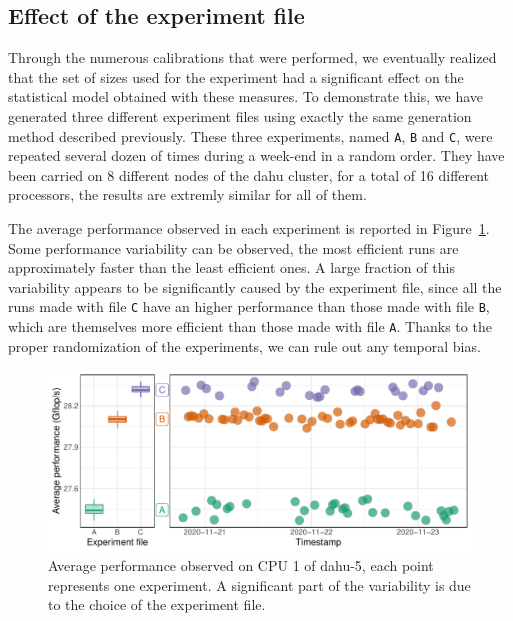         \subsection{Effect of the experiment file}%
        \label{sub:effect_experiment_file}

            Through the numerous \dgemm calibrations that were performed, we eventually realized that the set of sizes
            used for the experiment had a significant effect on the statistical model obtained with these measures. To
            demonstrate this, we have generated three different experiment files using exactly the same generation
            method described previously. These three experiments, named \texttt{A}, \texttt{B} and \texttt{C}, were
            repeated several dozen of times during a week-end in a random order. They have been carried on 8 different
            nodes of the dahu cluster, for a total of 16 different processors, the results are extremly similar for all
            of them.

            The average \dgemm performance observed in each experiment is reported in
            Figure~\ref{fig:randomizing_sizes:expfile:average_perf}. Some performance variability can be observed, the
            most efficient runs are approximately  faster than the least efficient ones. A large
            fraction of this variability appears to be significantly caused by the experiment file, since all the runs
            made with file \texttt{C} have an higher performance than those made with file \texttt{B}, which are
            themselves more efficient than those made with file \texttt{A}. Thanks to the proper randomization of the
            experiments, we can rule out any temporal bias.

            \begin{figure}[htpb]
                \centering
                \includegraphics[width=\linewidth]{img/experiment/randomizing_sizes/expfile/average_performance.pdf}
                \caption{Average performance observed on CPU 1 of dahu-5, each point represents one experiment. A
                significant part of the variability is due to the choice of the experiment file.}%
                \label{fig:randomizing_sizes:expfile:average_perf}
            \end{figure}

